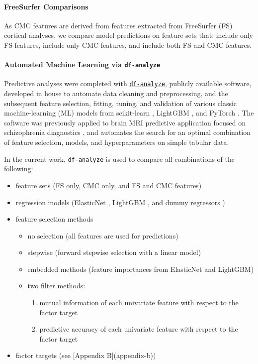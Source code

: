 \documentclass{article}
\begin{document}
\paragraph{FreeSurfer Comparisons}

As CMC features are derived from features extracted from FreeSurfer (FS)
cortical analyses, we compare model predictions on feature sets that: include
only FS features, include only CMC features, and include both FS and CMC
features.

\paragraph{Automated Machine Learning via \texttt{df-analyze}}


Predictive analyses were completed with
\href{github.com/stfxecutables/df-analyze}{\texttt{df-analyze}}, publicly
available software, developed in house to automate data cleaning and
preprocessing, and the subsequent feature selection, fitting, tuning, and
validation of various classic machine-learning (ML) models from scikit-learn
\citep{JMLR:v12:pedregosa11a}, LightGBM \citep{LightGBMNIPS2017} , and
PyTorch \citep{Ansel2024PyTorch}. The software was previously applied to
brain MRI predictive application focused on schizophrenia diagnostics
\citep{levmanMorphologicalStudySchizophrenia2022}, and automates the search
for an optimal combination of feature selection, models, and hyperparameters
on simple tabular data.

In the current work, \texttt{df-analyze} is used to compare all combinations
of the following:

\begin{itemize}
\item feature sets (FS only, CMC only, and FS and CMC features)
\item regression models (ElasticNet \citep{Zou2005,JMLR:v12:pedregosa11a},
LightGBM \citep{LightGBMNIPS2017}, and dummy regressors
\citep{JMLR:v12:pedregosa11a})
\item feature selection methods
	\begin{itemize}
		\item no selection (all features are used for predictions)
		\item stepwise (forward stepwise selection with a linear model)
		\item embedded methods (feature importances from ElasticNet and LightGBM)
		\item two filter methods:
		\begin{enumerate}
			\item mutual information of each univariate feature with respect to the
			factor target
			\item predictive accuracy of each univariate feature with respect to
			the factor target
		\end{enumerate}
	\end{itemize}
\item factor targets (see [Appendix B](appendix-b))
\end{itemize}
\end{document}
